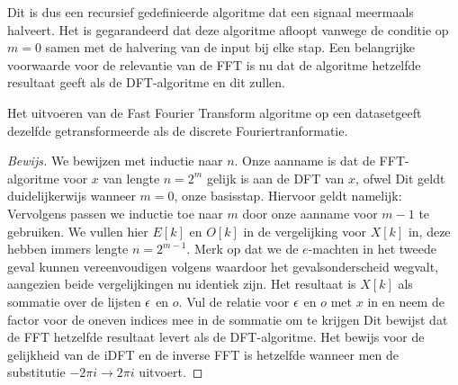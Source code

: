 Dit is dus een recursief gedefinieerde algoritme dat een signaal meermaals halveert.
Het is gegarandeerd dat deze algoritme afloopt vanwege de conditie op $m=0$ samen met de halvering van de input bij elke stap. 
Een belangrijke voorwaarde voor de relevantie van de FFT is nu dat de algoritme hetzelfde resultaat geeft als de DFT-algoritme en dit zullen.
\begin{stelling}
  Het uitvoeren van de Fast Fourier Transform algoritme op een datasetgeeft
  dezelfde getransformeerde als de discrete Fouriertranformatie.
\end{stelling}
\begin{proof}[Bewijs]
We bewijzen met inductie naar $n$. Onze aanname is dat de FFT-algoritme voor $x$ van lengte $n=2^m$ gelijk is aan de DFT van $x$, ofwel
Dit geldt duidelijkerwijs wanneer $m=0$, onze basisstap. Hiervoor geldt namelijk:
Vervolgens passen we inductie toe naar $m$ door onze aanname voor $m-1$ te gebruiken. We vullen hier $E[k]$ en $O[k]$ in de vergelijking voor $X[k]$ in, deze hebben immers lengte $n=2^{m-1}$.
Merk op dat we de $e$-machten in het tweede geval kunnen vereenvoudigen volgens
waardoor het gevalsonderscheid wegvalt, aangezien beide vergelijkingen nu identiek zijn.
Het resultaat is $X[k]$ als sommatie over de lijsten $\epsilon$ en $o$. Vul de relatie voor $\epsilon$ en $o$ met $x$ in en neem de factor voor de oneven indices mee in de sommatie om te krijgen
Dit bewijst dat de FFT hetzelfde resultaat levert als de DFT-algoritme. Het bewijs voor de gelijkheid van de iDFT en de inverse FFT is 
hetzelfde wanneer men de substitutie $-2\pi i \rightarrow 2\pi i$ uitvoert.
\end{proof}

